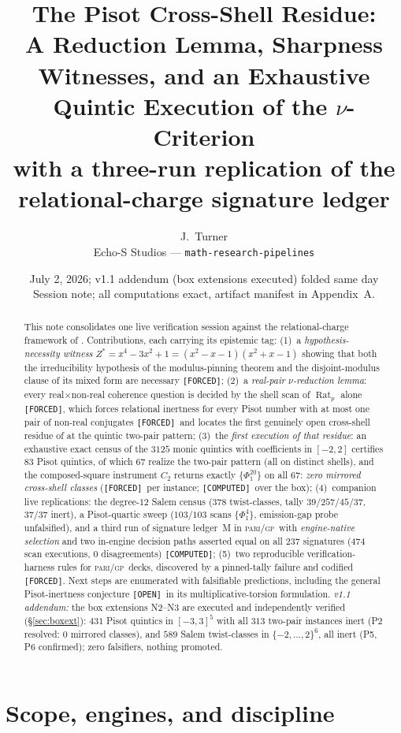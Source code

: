 \documentclass[11pt]{article}
\title{\textbf{The Pisot Cross-Shell Residue:}\\
A Reduction Lemma, Sharpness Witnesses, and an Exhaustive Quintic Execution of the $\nu$-Criterion\\
\large with a three-run replication of the relational-charge signature ledger}
\author{J.~Turner\\ \small Echo-S Studios --- \texttt{math-research-pipelines}}
\date{July 2, 2026; v1.1 addendum (box extensions executed) folded same day \\ \small Session note; all computations exact, artifact manifest in Appendix~A.}
\newcommand{\F}{\textnormal{\texttt{[FORCED]}}}
\newcommand{\C}{\textnormal{\texttt{[COMPUTED]}}}
\newcommand{\Op}{\textnormal{\texttt{[OPEN]}}}
\newcommand{\Rat}{\operatorname{Rat}}
\newcommand{\gp}{\textsc{pari/gp}}
\theoremstyle{definition}
\begin{document}
\maketitle

\begin{abstract}
This note consolidates one live verification session against the relational-charge
framework of \cite{relcharge}. Contributions, each carrying its epistemic tag:
(1)~a \emph{hypothesis-necessity witness} $Z^{*}=x^4-3x^2+1=(x^2-x-1)(x^2+x-1)$
showing that both the irreducibility hypothesis of the modulus-pinning theorem and
the disjoint-modulus clause of its mixed form are necessary \F;
(2)~a \emph{real-pair $\nu$-reduction lemma}: every real$\times$non-real coherence
question is decided by the shell scan of $\Rat_p$ alone \F, which forces relational
inertness for every Pisot number with at most one pair of non-real conjugates \F\
and locates the first genuinely open cross-shell residue of \cite[Cor.~7.16]{relcharge}
at the quintic two-pair pattern;
(3)~the \emph{first execution of that residue}: an exhaustive exact census of the
$3125$ monic quintics with coefficients in $[-2,2]$ certifies $83$ Pisot quintics,
of which $67$ realize the two-pair pattern (all on distinct shells), and the
composed-square instrument $C_2$ returns exactly $\{\Phi_1^{20}\}$ on all $67$:
\emph{zero mirrored cross-shell classes} (\F\ per instance; \C\ over the box);
(4)~companion live replications: the degree-$12$ Salem census
($378$ twist-classes, tally $39/257/45/37$, $37/37$ inert), a Pisot-quartic sweep
($103/103$ scans $\{\Phi_1^4\}$, emission-gap probe unfalsified), and a third run
of signature ledger~M in \gp\ with \emph{engine-native selection} and two
in-engine decision paths asserted equal on all $237$ signatures ($474$ scan
executions, $0$ disagreements) \C;
(5)~two reproducible verification-harness rules for \gp\ decks, discovered by a
pinned-tally failure and codified \F.
Next steps are enumerated with falsifiable predictions, including the general
Pisot-inertness conjecture \Op\ in its multiplicative-torsion formulation.
\emph{v1.1 addendum:} the box extensions N2--N3 are executed and independently
verified (\S\ref{sec:boxext}): $431$ Pisot quintics in $[-3,3]^5$ with all
$313$ two-pair instances inert (P2 resolved: $0$ mirrored classes), and $589$
Salem twist-classes in $\{-2,\dots,2\}^6$, all inert (P5, P6 confirmed); zero
falsifiers, nothing promoted.
\end{abstract}

\section{Scope, engines, and discipline}\label{sec:scope}
\end{document}
